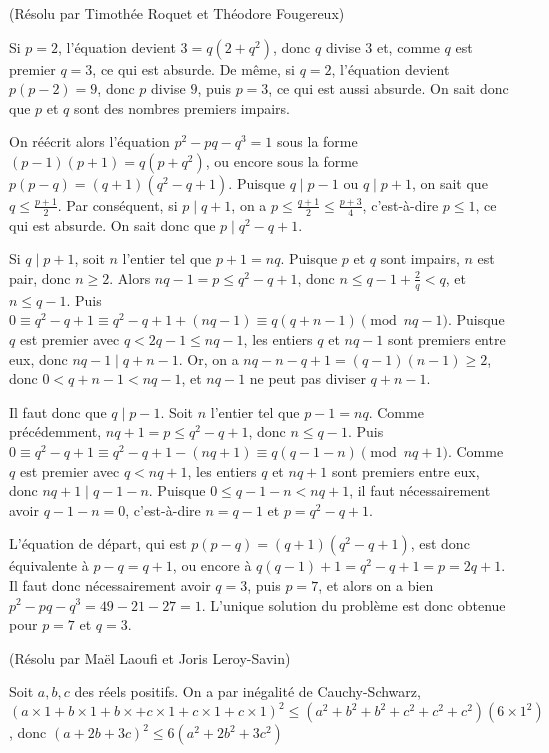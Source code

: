 \begin{sol}[79](Résolu par Timothée Roquet et Théodore Fougereux)
 
Si $p = 2$, l'équation devient $3=q(2+q^2)$, donc $q$ divise $3$ et, comme $q$ est premier $q = 3$, ce qui est absurde.
De même, si $q = 2$, l'équation devient $p(p-2) = 9$, donc $p$ divise $9$, puis $p = 3$, ce qui est aussi absurde.
On sait donc que $p$ et $q$ sont des nombres premiers impairs.
 
On réécrit alors l'équation $p^2-pq-q^3=1$ sous la forme
$(p-1)(p+1) = q(p+q^2)$, ou encore sous la forme $p(p-q) = (q+1)(q^2-q+1)$.
Puisque $q \mid p-1$ ou $q \mid p+1$, on sait que $q \leq \frac{p+1}{2}$.
Par conséquent, si $p \mid q+1$, on a $p \leq \frac{q+1}{2} \leq \frac{p+3}{4}$, c'est-à-dire $p \leq 1$, ce qui est absurde.
On sait donc que $p \mid q^2-q+1$.

Si $q \mid p+1$, soit $n$ l'entier tel que $p+1 = nq$. Puisque $p$ et $q$ sont impairs, $n$ est pair, donc $n \geq 2$.
Alors $nq-1 = p \leq q^2-q+1$, donc $n \leq q-1 + \frac{2}{q} < q$,
et $n \leq q-1$. Puis $0 \equiv q^2-q+1 \equiv q^2-q+1+(nq-1) \equiv q(q+n-1) \pmod{nq-1}$.
Puisque $q$ est premier avec $q < 2q-1 \leq nq-1$, les entiers $q$ et $nq-1$ sont premiers entre eux, donc $nq-1 \mid q+n-1$.
Or, on a $nq - n - q + 1 = (q-1)(n-1) \geq 2$, donc
$0 < q+n-1 < nq-1$, et $nq-1$ ne peut pas diviser $q+n-1$.

Il faut donc que $q \mid p-1$. Soit $n$ l'entier tel que $p-1 = nq$. Comme précédemment, $nq+1 = p \leq q^2-q+1$, donc $n \leq q-1$.
Puis $0 \equiv q^2-q+1 \equiv q^2-q+1-(nq+1) \equiv q(q-1-n) \pmod{nq+1}$. Comme $q$ est premier avec $q < nq+1$,
les entiers $q$ et $nq+1$ sont premiers entre eux, donc $nq+1 \mid q-1-n$. Puisque $0 \leq q-1-n < nq+1$, il
faut nécessairement avoir $q-1-n = 0$, c'est-à-dire $n = q-1$ et $p = q^2-q+1$.

L'équation de départ, qui est $p(p-q) = (q+1)(q^2-q+1)$, est donc équivalente à $p-q = q+1$, ou encore à $q(q-1)+1 = q^2-q+1 = p = 2q+1$.
Il faut donc nécessairement avoir $q = 3$, puis $p = 7$, et alors on a bien $p^2-pq-q^3 = 49 - 21 - 27 = 1$.
L'unique solution du problème est donc obtenue pour $p = 7$ et $q = 3$.
\end{sol}

\begin{sol}[80](Résolu par Maël Laoufi et Joris Leroy-Savin)

Soit $a,b,c$ des r\'eels positifs. On a par in\'egalit\'e de Cauchy-Schwarz,\\
$(a \times 1+ b\times 1+b \times+ c\times 1+c \times 1 +c\times 1)^2 \leq (a^2+b^2+b^2+c^2+c^2+c^2)(6 \times 1^2)$,
donc $(a+2b+3c)^2 \leq 6(a^2+2b^2+3c^2)$



\end{sol}


